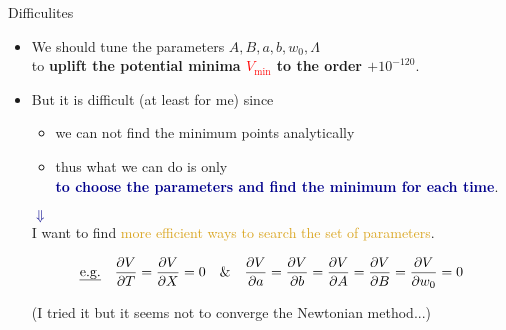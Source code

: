\documentclass[
  unicode,a4paper,10pt,
  xcolor = {dvipsnames,svgnames},
  hyperref ={colorlinks=true,citecolor=Navy,linkcolor=NavyBlue,urlcolor=purple},
  ja=standard,lualatex
]{beamer}
\begin{document}
\begin{frame}{Difficulites}

  \begin{itemize}
    \item
          We should tune the parameters $A,B,a,b,w_{0},\Lambda$\\
          to \textbf{uplift the potential minima \textcolor{red}{$V_{\mathrm{min}}$} to the order $+10^{-120}$}.

          \pause

    \item
          But it is difficult (at least for me) since
          \begin{itemize}
            \item
                  we can not find the minimum points analytically
            \item
                  thus what we can do is only\\
                  \qquad \textbf{\textcolor{DarkBlue}{to choose the parameters and find the minimum for each time}}.
          \end{itemize}

          \pause

          \begin{center}
            {\huge \textcolor{DarkBlue}{$\Downarrow$}}
            \\
            I want to find \textcolor{Goldenrod}{more efficient ways to search the set of parameters}.
          \end{center}

          \begin{equation}
            \text{\uline{e.g.}}
            \quad
            \pdv{V}{T}
            =
            \pdv{V}{X}
            =
            0
            \quad
            \&
            \quad
            \pdv{V}{a}
            =
            \pdv{V}{b}
            =
            \pdv{V}{A}
            =
            \pdv{V}{B}
            =
            \pdv{V}{w_{0}}
            =
            0
            \nonumber
          \end{equation}
          \begin{center}
            (I tried it but it seems not to converge the Newtonian method...)
          \end{center}

  \end{itemize}

\end{frame}
\end{document}
